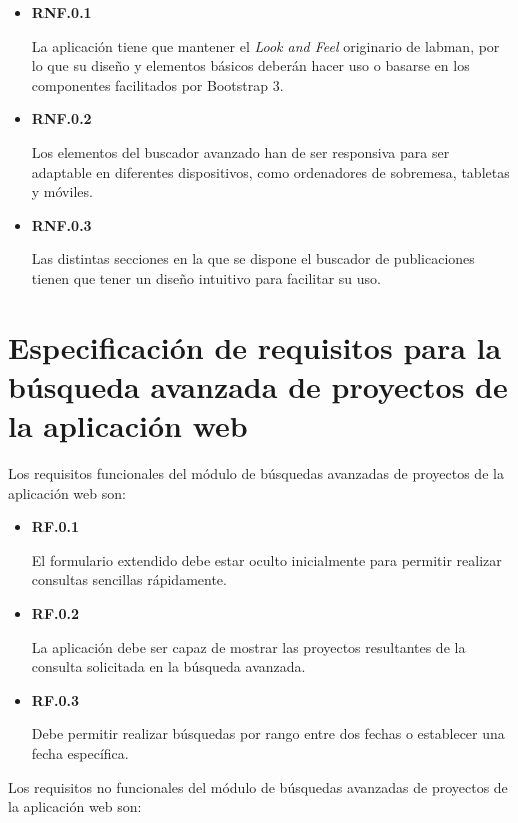 \begin{itemize}
	\item \textbf{RNF.0.1}

	La aplicación tiene que mantener el \textit{Look and Feel} originario de \acrshort{labman}, por lo que su diseño y elementos básicos deberán hacer uso o basarse en los componentes facilitados por Bootstrap 3\cite{Bootstrap}.

	\item \textbf{RNF.0.2}

	Los elementos del buscador avanzado han de ser responsiva para ser adaptable en diferentes dispositivos, como ordenadores de sobremesa, tabletas y móviles.

	\item \textbf{RNF.0.3}

	Las distintas secciones en la que se dispone el buscador de publicaciones tienen que tener un diseño intuitivo para facilitar su uso.	
\end{itemize}


\section{Especificación de requisitos para la búsqueda avanzada de proyectos de la aplicación web}

Los requisitos funcionales del módulo de búsquedas avanzadas de proyectos de la aplicación web son:

\begin{itemize}
	\item \textbf{RF.0.1}

	El formulario extendido debe estar oculto inicialmente para permitir realizar consultas sencillas rápidamente.

	\item \textbf{RF.0.2}

	La aplicación debe ser capaz de mostrar las proyectos resultantes de la consulta solicitada en la búsqueda avanzada.

	\item \textbf{RF.0.3}

	Debe permitir realizar búsquedas por rango entre dos fechas o establecer una fecha específica.
	
\end{itemize}

Los requisitos no funcionales del módulo de búsquedas avanzadas de proyectos de la aplicación web son:

